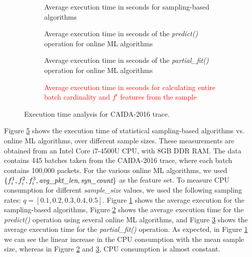 		\begin{figure}[!tb]
			\centering
			\begin{subfigure}{.95\columnwidth}
				\centering
				\small
				
				\caption{Average execution time in seconds for sampling-based algorithms}
				\label{table:time_estimate}
			\end{subfigure}
			\vspace{5mm}
			
			\begin{subfigure}{.95\columnwidth}
				\centering
				\small
				
				\caption{Average execution time in seconds of the \emph{predict()} operation for online ML algorithms}
				\label{table:time_predict}
			\end{subfigure}
			
			\vspace{5mm}
			\begin{subfigure}{.95\columnwidth}
				\centering
				\small
				
				\caption{Average execution time in seconds of the \emph{partial\_fit()} operation for online ML algorithms}
				\label{table:time_fit}
			\end{subfigure}
			
			\vspace{5mm}
			\begin{subfigure}{.95\columnwidth}
				\centering
				\small
				
				\caption{\textcolor{red}{Average execution time in seconds for calculating entire batch cardinality and $f^i$ features from the sample}}
				\label{table:time_features_labels}
			\end{subfigure}
		
			\caption{Execution time analysis for CAIDA-2016 trace.}
			\label{fig:time_analysis}
		\end{figure}
		
		Figure \ref{fig:time_analysis} shows the execution time of statistical sampling-based algorithms vs. online ML algorithms, over different sample sizes. These measurements are obtained from an Intel Core i7-4500U CPU, with 8GB DDR RAM. The data contains 445 batches taken from the CAIDA-2016 trace, where each batch contains 100,000 packets. For the various online ML algorithms, we used $\{f_i^1, f_i^2, f_i^3, \emph{avg\_pkt\_len}, \emph{syn\_count}\}$ as the feature set. To measure CPU consumption for different \emph{sample\_size} values, we used the following sampling rates: $q = [0.1, 0.2, 0.3, 0.4, 0.5]$. Figure \ref{table:time_estimate} shows the average execution for the sampling-based algorithms,  Figure \ref{table:time_predict} shows the average execution time for the \emph{predict()} operation using several online ML algorithms, and Figure \ref{table:time_fit} shows the average execution time for the \emph{partial\_fit()} operation. As expected, in Figure \ref{table:time_estimate} we can see the linear increase in the CPU consumption with the mean sample size, whereas in Figure \ref{table:time_predict} and \ref{table:time_fit}, CPU consumption is almost constant.

